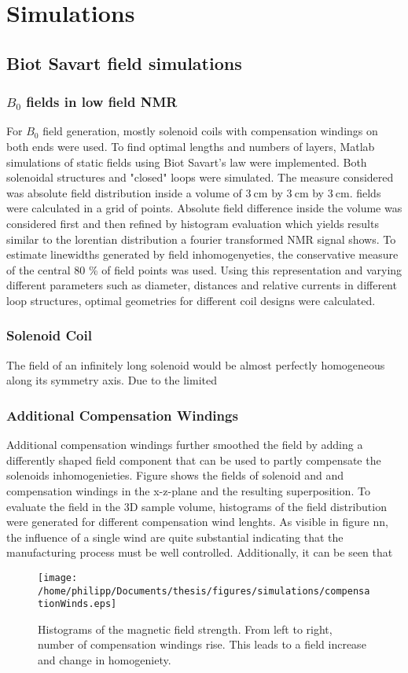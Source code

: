 \chapter{Simulations}\label{chapter:simulations}
\section{Biot Savart field simulations}
\subsection{$B_0$ fields in low field NMR}\label{simulations:B0}
		For $B_0$ field generation, mostly solenoid coils with compensation windings on both ends
		were used. To find optimal lengths and numbers of layers, Matlab simulations of static fields using Biot Savart's law were implemented.
		Both solenoidal structures and "closed" loops were simulated.
		The measure considered was absolute field distribution inside a volume of
		$\SI{3}{\centi\meter}$ by  $\SI{3}{\centi\meter}$ by $\SI{3}{\centi\meter}$. 
		fields were calculated in a grid of  points. Absolute field difference inside the volume was considered first and then refined by
		histogram evaluation which yields results similar to the lorentian distribution a fourier transformed NMR signal shows. To estimate linewidths generated by field inhomogenyeties, the conservative measure of the central 80 \% of field points was used.
		Using this representation and varying different parameters such as diameter, distances and relative currents in different loop structures, optimal geometries for different coil designs were calculated.
		\subsection{Solenoid Coil}
			The field of an infinitely long solenoid would be almost perfectly homogeneous along its symmetry axis. Due to the limited
		\subsection{Additional Compensation Windings}
			Additional compensation windings further smoothed the field by adding a differently shaped field component that can be used to partly compensate the solenoids inhomogenieties. Figure  shows the fields of solenoid and and compensation windings in the x-z-plane and the resulting superposition.
			To evaluate the field in the 3D sample volume, histograms of the field distribution were generated for different compensation wind lenghts. As visible in figure nn, the influence of a single wind are quite substantial indicating that the manufacturing process must be well controlled. Additionally, it can be seen that
			\begin{figure}[b]
				\centering
				\texttt{[image: /home/philipp/Documents/thesis/figures/simulations/compensationWinds.eps]}
				\caption{Histograms of the magnetic field strength. From left to right, number of compensation windings rise. This leads to a field increase and change in homogeniety.}
			\end{figure}

